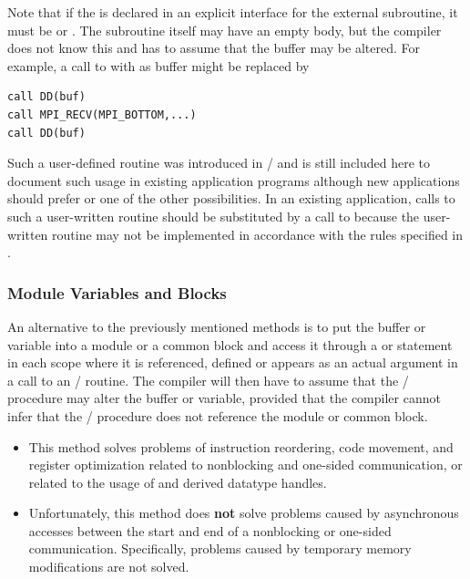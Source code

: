 Note that if the  is declared in an explicit interface for the external subroutine, it
must be  or . The subroutine itself may have an empty body, but
the compiler does not know this and has to assume that the buffer may
be altered.  For example, a call to
 with  as buffer might be replaced by
\begin{lstlisting}[language={[MPI]Fortran}]
call DD(buf)
call MPI_RECV(MPI_BOTTOM,...)
call DD(buf)
\end{lstlisting}
Such a user-defined routine was introduced in \MPIIIDOTO/ and is still included here
to document such usage in existing application programs although
new applications should prefer  or one of the
other possibilities.
In an existing application, calls to such a user-written routine should
be substituted by a call to  because the
user-written routine may not be implemented in accordance with the
rules specified in .

\subsubsection{Module Variables and \texorpdfstring{}{COMMON} Blocks}

An alternative to the previously mentioned methods is to put the buffer or variable into a module or a
common block and access it through a  or  statement in each
scope where it is referenced, defined or appears as an actual argument
in a call to an \MPI/ routine. The compiler will then have to assume that
the \MPI/ procedure may alter the buffer
or variable, provided that the compiler cannot infer that the \MPI/
procedure does not reference the module or common block.
\begin{itemize}
\item This method solves problems of instruction reordering, code movement,
   and register optimization
   related to nonblocking and one-sided communication,
   or related to the usage of  and derived datatype handles.
\item Unfortunately, this method does \textbf{not} solve problems
   caused by asynchronous accesses between the start and
   end of a nonblocking or one-sided communication. Specifically,
   problems caused by temporary memory modifications are not solved.
\end{itemize}

